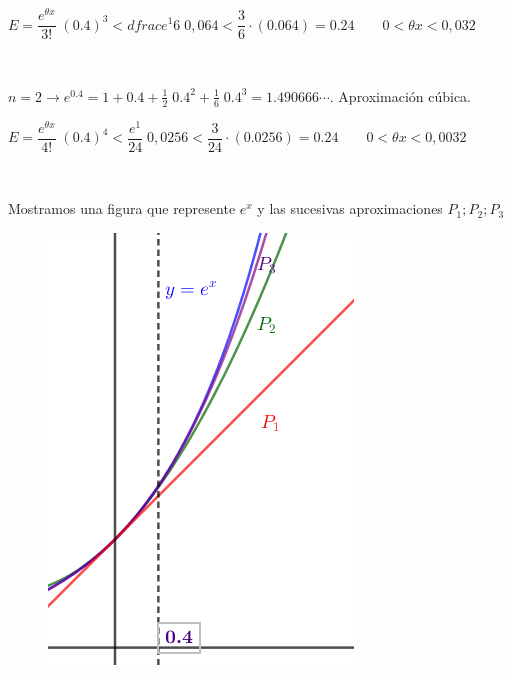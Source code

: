 \begin{ejem}
	$E=\dfrac {e^{\theta x}}{3!}\; (0.4)^3 < dfrac {e^1}{6}\; 0,064 < \dfrac {3}{6} \cdot (0.064)=0.24 \qquad 0<\theta x< 0,032$
	
	

	$\quad$
	
	$n=2 \to e^{0.4}=1+0.4+\frac 1 2 \; 0.4^2+ \frac 1 {6}\; 0.4^3 =1.490666\cdots $. Aproximación cúbica.
	
	$E=\dfrac {e^{\theta x}}{4!}\; (0.4)^4 < \dfrac {e^1}{24}\; 0,0256 < \dfrac {3}{24} \cdot (0.0256)=0.24 \qquad 0<\theta x< 0,0032$
	
	$\quad$
	
	Mostramos una figura que represente $e^x$ y las sucesivas aproximaciones $ P_1; P_2; P_3$
	
	\begin{figure}[H]
	\centering
		\includegraphics[width=.4\textwidth]{imagenes/imagenes06/T06IM04.png}
		\end{figure}
	
	\end{ejem}
	 
